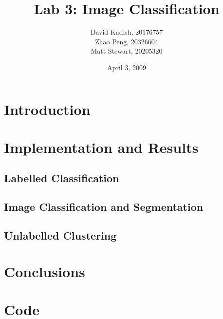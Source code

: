 \documentclass{sydeStyle}
\title{Lab 3: Image Classification}
\author{
    David Kadish, 20176757\\
    Zhao Peng, 20326604\\
    Matt Stewart, 20205320\\
}
\date{April 3, 2009}
\numberwithin{algorithm}{chapter}
\begin{document}

\maketitle

\setcounter{page}{2} %


\chapter{Introduction}


\chapter{Implementation and Results}
\section{Labelled Classification}
\section{Image Classification and Segmentation}
\section{Unlabelled Clustering}



\chapter{Conclusions}


\appendix
\renewcommand{\thechapter}{\Alph{chapter}}

\chapter{Code}

\end{document}
